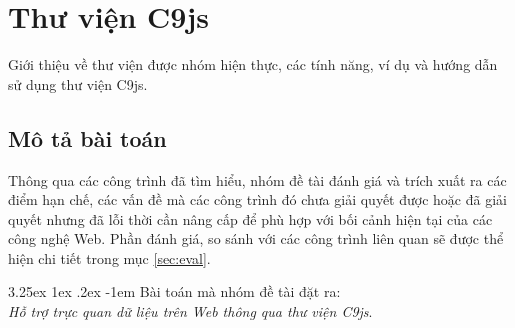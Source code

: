 \documentclass[12pt,a4paper,twoside]{article}
\makeatletter
\newcommand{\myparagraph}[1]{\paragraph{#1}\mbox{}\\} %
\renewcommand\paragraph{\@startsection{paragraph}{5}{\z@}%
  {3.25ex \@plus1ex \@minus.2ex}%
  {-1em}%
  {\normalfont\normalsize\bfseries}}
\makeatother
\begin{document}
\section{Thư viện C9js}
Giới thiệu về thư viện được nhóm hiện thực, các tính năng, ví dụ và hướng dẫn sử dụng thư viện C9js.
\subsection{Mô tả bài toán}
Thông qua các công trình đã tìm hiểu, nhóm đề tài đánh giá và trích xuất ra các điểm hạn chế, các vấn đề mà các công trình đó chưa giải quyết được hoặc đã giải quyết nhưng đã lỗi thời cần nâng cấp để phù hợp với bối cảnh hiện tại của các công nghệ Web. Phần đánh giá, so sánh với các công trình liên quan sẽ được thể hiện chi tiết trong mục \ref{sec:eval}.

\myparagraph{Bài toán mà nhóm đề tài đặt ra:}
\textit{Hỗ trợ trực quan dữ liệu trên Web thông qua thư viện C9js}.
 
\end{document}

